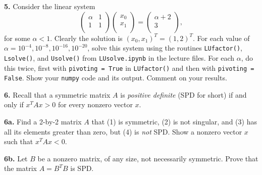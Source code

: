 \documentclass[11pt]{article}
\begin{document}
\par\bigskip
{\bf 5.} Consider the linear system
$$
   \left(
   \begin{array}{cc}
      \alpha & 1 \\ 	
           1 & 1 \\ 	
   \end{array} \right)
   \left(
   \begin{array}{c}
      x_0 \\ 	
      x_1 \\ 	
   \end{array} \right)
   =
   \left(
   \begin{array}{cc}
      \alpha + 2 \\ 	
               3 \\ 	
   \end{array} \right),
$$
for some $\alpha < 1$.
Clearly the solution is $(x_0, x_1)^T = (1,2)^T$.
For each value of $\alpha = 10^{-4}, 10^{-8}, 10^{-16}, 10^{-20}$,
solve this system using the routines {\tt LUfactor()}, {\tt Lsolve()}, 
and {\tt Usolve()} from {\tt LUsolve.ipynb} in the lecture files.
For each $\alpha$, do this twice, first with {\tt pivoting = True} in {\tt LUfactor()}
and then with {\tt pivoting = False}.
Show your {\tt numpy} code and its output.
Comment on your results.


\par\bigskip
{\bf 6.} Recall that a symmetric matrix $A$ is {\em positive definite}
(SPD for short) if and only if $x^TAx>0$ for every nonzero vector $x$.

\par\medskip
{\bf 6a.} Find a 2-by-2 matrix $A$ that (1) is symmetric, (2) is not singular,
and (3) has all its elements greater than zero, but (4) is {\em not} SPD.
Show a nonzero vector $x$ such that $x^TAx<0$.

\par\medskip
{\bf 6b.} Let $B$ be a nonzero matrix, of any size, not necessarily symmetric.
Prove that the matrix $A=B^TB$ is SPD.
\end{document}
